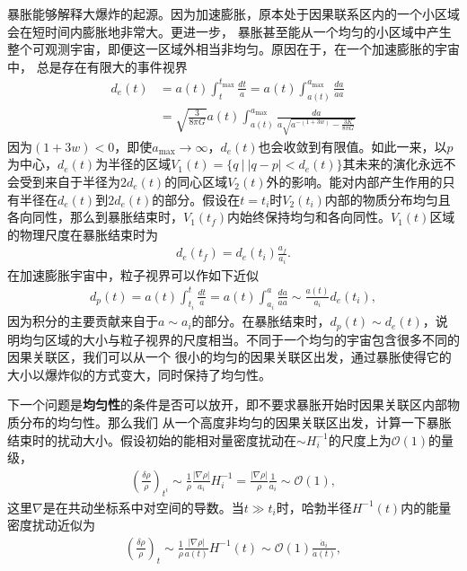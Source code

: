 暴胀能够解释大爆炸的起源。因为加速膨胀，原本处于因果联系区内的一个小区域会在短时间内膨胀地非常大。更进一步，
暴胀甚至能从一个均匀的小区域中产生整个可观测宇宙，即便这一区域外相当非均匀。原因在于，在一个加速膨胀的宇宙中，
总是存在有限大的事件视界
\begin{equation}
  \begin{split}
    d_{e}(t) &= a(t)\int_t^{t_{\text{max}}} \frac{dt}{a}
    =a(t)\int_{a(t)}^{a_{\text{max}}} \frac{da}{\dot{a}a} \\
    &= \sqrt{\frac{3}{8\pi G}}a(t)\int_{a(t)}^{a_{\text{max}}}
    \frac{da}{a\sqrt{a^{-(1+3w)}-\frac{3K}{8\pi G}}} 
  \end{split}
\end{equation}
因为${\left(1+3w\right)}<0$，即使$a_{\text{max}}\rightarrow
\infty$，$d_{e}(t)$也会收敛到有限值。如此一来，以$
p$为中心，$d_{e}(t)$为半径的区域$V_1(t)=\{q\ |\
|q-p|<d_{e}(t)\}$其未来的演化永远不会受到来自于半径为$2d_{e}(t)$的同心区域$V_2(t)$外的影响。能对内部产生作用的只有半径在$d_{e}(t)$到$2d_{e}(t)$的部分。假设在$t=t_{i}$时$V_2(t_{i})$内部的物质分布均匀且各向同性，那么到暴胀结束时，$V_1(t_{f})$内始终保持均匀和各向同性。$V_1(t)$区域的物理尺度在暴胀结束时为
\begin{align}
  d_{e}(t_{f})=d_e(t_{i}) \frac{a_{f}}{a_{i}}.
\end{align}
在加速膨胀宇宙中，粒子视界可以作如下近似
\begin{align}
  d_{p}(t) =a(t)\int_{t_{i}}^{t} \frac{dt}{a}=a(t)\int_{a_{i}}^{a}
  \frac{da}{\dot{a}a}\sim \frac{a(t)}{a_{i}}d_{e}(t_i),  
\end{align}
因为积分的主要贡献来自于$a\sim a_{i}$的部分。在暴胀结束时，$d_{p}(t)\sim
d_{e}(t)$，说明均匀区域的大小与粒子视界的尺度相当。不同于一个均匀的宇宙包含很多不同的因果关联区，我们可以从一个
很小的均匀的因果关联区出发，通过暴胀使得它的大小以爆炸似的方式变大，同时保持了均匀性。

下一个问题是\textbf{均匀性}的条件是否可以放开，即不要求暴胀开始时因果关联区内部物质分布的均匀性。那么我们
从一个高度非均匀的因果关联区出发，计算一下暴胀结束时的扰动大小。假设初始的能相对量密度扰动在$\sim
H_{i}^{-1}$的尺度上为$\mathcal{O}(1)$的量级，
\begin{align}
  {\left(\frac{\delta \rho}{\rho}\right)}_{t^{i}}
  \sim \frac{1}{\rho} \frac{|\nabla\rho|}{a_{i}}H_{i}^{-1}
  =\frac{|\nabla\rho|}{\rho}\frac{1}{\dot{a}_{i}}
  \sim \mathcal{O}(1),
\end{align}
这里$\nabla$是在共动坐标系中对空间的导数。当$t\gg
t_{i}$时，哈勃半径$H^{-1}(t)$内的能量密度扰动近似为
\begin{align}
  \label{eq:relative-energy-density-perturbation}
  {\left(\frac{\delta\rho}{\rho}\right)}_{t}
  \sim \frac{1}{\rho} \frac{|\nabla\rho|}{a(t)}H^{-1}(t)
  \sim \mathcal{O}(1) \frac{\dot{a}_{i}}{\dot{a}(t)},
\end{align}

